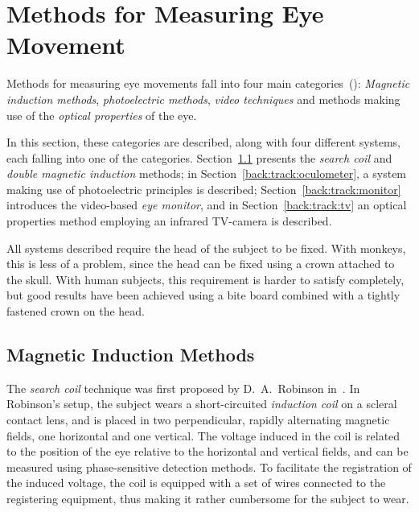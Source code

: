 
\section{Methods for Measuring Eye Movement}
\label{back:track}

Methods for measuring eye movements fall into four main
categories~(\cite{monitor}): {\em Magnetic induction methods\/}, {\em
  photoelectric methods\/}, {\em video techniques\/} and methods
making use of the {\em optical properties\/} of the eye.

In this section, these categories are described, along with four
different systems, each falling into one of the categories.
Section~\ref{back:track:coil} presents the {\em search coil\/} and
{\em double magnetic induction\/} methods; in
Section~\ref{back:track:oculometer}, a system making use of
photoelectric principles is described;
Section~\ref{back:track:monitor} introduces the video-based {\em eye
  monitor\/}, and in Section~\ref{back:track:tv} an optical properties
method employing an infrared TV-camera is described.

All systems described require the head of the subject to be fixed.
With monkeys, this is less of a problem, since the head can be fixed
using a crown attached to the skull.  With human subjects, this
requirement is harder to satisfy completely, but good results have
been achieved using a bite board combined with a tightly fastened
crown on the head.

\subsection{Magnetic Induction Methods}
\label{back:track:coil}

The {\em search coil\/} technique was first proposed by D.\ A.\ 
Robinson in~\cite{robinson}.  In Robinson's setup, the subject wears a
short-circuited {\em induction coil\/} on a scleral contact lens, and
is placed in two perpendicular, rapidly alternating magnetic fields,
one horizontal and one vertical.  The voltage induced in the coil is
related to the position of the eye relative to the horizontal and
vertical fields, and can be measured using phase-sensitive detection
methods.  To facilitate the registration of the induced voltage, the
coil is equipped with a set of wires connected to the registering
equipment, thus making it rather cumbersome for the subject to wear.

